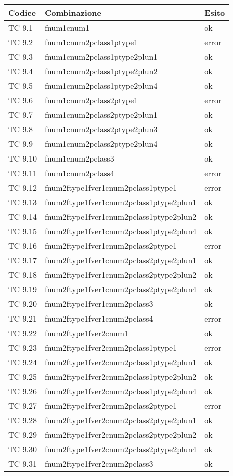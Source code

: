 \vspace{1cm}

\begin{longtable}{|p{3cm}|p{7cm}|p{3cm}|}
	\hline
	\rowcolor{Gray}
	\textbf{Codice} & \textbf{Combinazione} & \textbf{Esito}\tabularnewline
	\hline
	TC 9.1			& fnum1cnum1					& ok \tabularnewline
	\hline
	TC 9.2			& fnum1cnum2pclass1ptype1			& error \tabularnewline
	\hline
	TC 9.3			& fnum1cnum2pclass1ptype2plun1			& ok \tabularnewline
	\hline
	TC 9.4			& fnum1cnum2pclass1ptype2plun2			& ok \tabularnewline
	\hline
	TC 9.5			& fnum1cnum2pclass1ptype2plun4			& ok \tabularnewline
	\hline
	TC 9.6			& fnum1cnum2pclass2ptype1			& error \tabularnewline
	\hline
	TC 9.7			& fnum1cnum2pclass2ptype2plun1			& ok \tabularnewline
	\hline
	TC 9.8			& fnum1cnum2pclass2ptype2plun3			& ok \tabularnewline
	\hline
	TC 9.9			& fnum1cnum2pclass2ptype2plun4			& ok \tabularnewline
	\hline
	TC 9.10			& fnum1cnum2pclass3				& ok \tabularnewline
	\hline
	TC 9.11			& fnum1cnum2pclass4				& error \tabularnewline
	\hline
	TC 9.12			& fnum2ftype1fver1cnum2pclass1ptype1		& error \tabularnewline
	\hline
	TC 9.13			& fnum2ftype1fver1cnum2pclass1ptype2plun1	& ok \tabularnewline
	\hline
	TC 9.14			& fnum2ftype1fver1cnum2pclass1ptype2plun2	& ok \tabularnewline
	\hline
	TC 9.15			& fnum2ftype1fver1cnum2pclass1ptype2plun4	& ok \tabularnewline
	\hline
	TC 9.16			& fnum2ftype1fver1cnum2pclass2ptype1		& error \tabularnewline
	\hline
	TC 9.17			& fnum2ftype1fver1cnum2pclass2ptype2plun1	& ok \tabularnewline
	\hline
	TC 9.18			& fnum2ftype1fver1cnum2pclass2ptype2plun2	& ok \tabularnewline
	\hline
	TC 9.19			& fnum2ftype1fver1cnum2pclass2ptype2plun4	& ok \tabularnewline
	\hline
	TC 9.20			& fnum2ftype1fver1cnum2pclass3			& ok \tabularnewline
	\hline
	TC 9.21			& fnum2ftype1fver1cnum2pclass4			& error \tabularnewline
	\hline
	TC 9.22			& fnum2ftype1fver2cnum1				& ok \tabularnewline
	\hline
	TC 9.23			& fnum2ftype1fver2cnum2pclass1ptype1		& error \tabularnewline
	\hline
	TC 9.24			& fnum2ftype1fver2cnum2pclass1ptype2plun1	& ok \tabularnewline
	\hline
	TC 9.25			& fnum2ftype1fver2cnum2pclass1ptype2plun2	& ok \tabularnewline
	\hline
	TC 9.26			& fnum2ftype1fver2cnum2pclass1ptype2plun4	& ok \tabularnewline
	\hline
	TC 9.27			& fnum2ftype1fver2cnum2pclass2ptype1		& error \tabularnewline
	\hline
	TC 9.28			& fnum2ftype1fver2cnum2pclass2ptype2plun1	& ok \tabularnewline
	\hline
	TC 9.29			& fnum2ftype1fver2cnum2pclass2ptype2plun2	& ok \tabularnewline
	\hline
	TC 9.30			& fnum2ftype1fver2cnum2pclass2ptype2plun4	& ok \tabularnewline
	\hline
	TC 9.31			& fnum2ftype1fver2cnum2pclass3			& ok \tabularnewline

\end{longtable}
